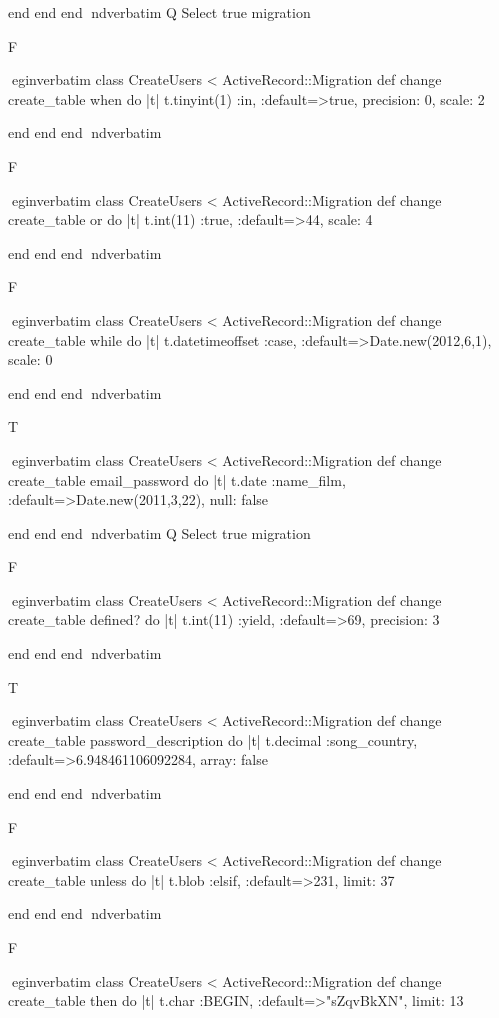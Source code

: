     end 
  end 
end
nd{verbatim}
Q
 Select true migration

F

egin{verbatim}
 class CreateUsers < ActiveRecord::Migration 
  def change 
    create_table when do |t| 
      t.tinyint(1) :in, :default=>true, precision: 0, scale: 2
    
    end 
  end 
end
nd{verbatim}

F

egin{verbatim}
 class CreateUsers < ActiveRecord::Migration 
  def change 
    create_table or do |t| 
      t.int(11) :true, :default=>44, scale: 4
    
    end 
  end 
end
nd{verbatim}

F

egin{verbatim}
 class CreateUsers < ActiveRecord::Migration 
  def change 
    create_table while do |t| 
      t.datetimeoffset :case, :default=>Date.new(2012,6,1), scale: 0
    
    end 
  end 
end
nd{verbatim}

T

egin{verbatim}
 class CreateUsers < ActiveRecord::Migration 
  def change 
    create_table email_password do |t| 
      t.date :name_film, :default=>Date.new(2011,3,22), null: false
    
    end 
  end 
end
nd{verbatim}
Q
 Select true migration

F

egin{verbatim}
 class CreateUsers < ActiveRecord::Migration 
  def change 
    create_table defined? do |t| 
      t.int(11) :yield, :default=>69, precision: 3
    
    end 
  end 
end
nd{verbatim}

T

egin{verbatim}
 class CreateUsers < ActiveRecord::Migration 
  def change 
    create_table password_description do |t| 
      t.decimal :song_country, :default=>6.948461106092284, array: false
    
    end 
  end 
end
nd{verbatim}

F

egin{verbatim}
 class CreateUsers < ActiveRecord::Migration 
  def change 
    create_table unless do |t| 
      t.blob :elsif, :default=>231, limit: 37
    
    end 
  end 
end
nd{verbatim}

F

egin{verbatim}
 class CreateUsers < ActiveRecord::Migration 
  def change 
    create_table then do |t| 
      t.char :BEGIN, :default=>"sZqvBkXN", limit: 13
    
